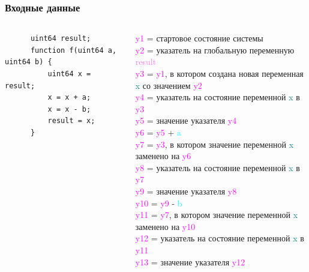 \documentclass{beamer}
\begin{document}
\begin{frame}[containsverbatim]\frametitle{Входные данные}
  {\fontsize{4}{2}\selectfont \begin{columns}
    \begin{verbatim}
      uint64 result;
      function f(uint64 a, uint64 b) {
          uint64 x = result;
          x = x + a;
          x = x - b;
          result = x;
      }
      \end{verbatim}
    \newenvironment{allintypewriter}{\ttfamily}{}\begin{allintypewriter}\textcolor{magenta}{y1} = стартовое состояние системы\\
    \textcolor{magenta}{y2} = указатель на глобальную переменную \textcolor{violet}{result}\\
    \textcolor{magenta}{y3} = \textcolor{magenta}{y1}, в котором создана новая переменная \textcolor{teal}{x} со значением \textcolor{magenta}{y2}\\
    \textcolor{magenta}{y4} = указатель на состояние переменной \textcolor{teal}{x} в \textcolor{magenta}{y3}\\
    \textcolor{magenta}{y5} = значение указателя \textcolor{magenta}{y4}\\
    \textcolor{magenta}{y6} = \textcolor{magenta}{y5} + \textcolor{cyan}{a}\\
    \textcolor{magenta}{y7} = \textcolor{magenta}{y3}, в котором значение переменной \textcolor{teal}{x} заменено на \textcolor{magenta}{y6}\\
    \textcolor{magenta}{y8} = указатель на состояние переменной \textcolor{teal}{x} в \textcolor{magenta}{y7}\\
    \textcolor{magenta}{y9} = значение указателя \textcolor{magenta}{y8}\\
    \textcolor{magenta}{y10} = \textcolor{magenta}{y9} - \textcolor{cyan}{b}\\
    \textcolor{magenta}{y11} = \textcolor{magenta}{y7}, в котором значение переменной \textcolor{teal}{x} заменено на \textcolor{magenta}{y10}\\
    \textcolor{magenta}{y12} = указатель на состояние переменной \textcolor{teal}{x} в \textcolor{magenta}{y11}\\
    \textcolor{magenta}{y13} = значение указателя \textcolor{magenta}{y12}\\

\end{allintypewriter}
\end{columns}}
\end{frame}
\end{document}

